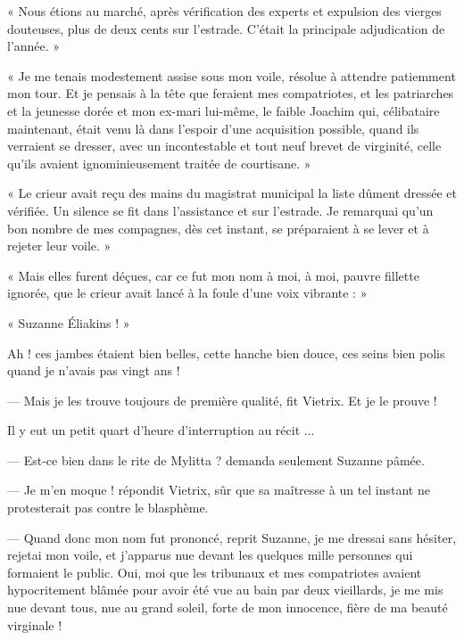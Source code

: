 \documentclass[a4paper, 11pt, oneside, polutonikogreek, french]{article}
\begin{document}
« Nous étions au marché, après vérification des experts et expulsion des vierges douteuses, plus de deux cents sur l'estrade. C'était la principale adjudication de l'année. »

« Je me tenais modestement assise sous mon voile, résolue à attendre patiemment mon tour. Et je pensais à la tête que feraient mes compatriotes, et les patriarches et la jeunesse dorée et mon ex-mari lui-même, le faible Joachim qui, célibataire maintenant, était venu là dans l'espoir d'une acquisition possible, quand ils verraient se dresser, avec un incontestable et tout neuf brevet de virginité, celle qu'ils avaient ignominieusement traitée de courtisane. »

« Le crieur avait reçu des mains du magistrat municipal la liste dûment dressée et vérifiée. Un silence se fit dans l'assistance et sur l'estrade. Je remarquai qu'un bon nombre de mes compagnes, dès cet instant, se préparaient à se lever et à rejeter leur voile. »

« Mais elles furent déçues, car ce fut mon nom à moi, à moi, pauvre fillette ignorée, que le crieur avait lancé à la foule d'une voix vibrante : »

« Suzanne Éliakins ! »

Ah ! ces jambes étaient bien belles, cette hanche bien douce, ces seins bien polis quand je n'avais pas vingt ans !

--- Mais je les trouve toujours de première qualité, fit Vietrix. Et je le prouve !

Il y eut un petit quart d'heure d'interruption au récit ...

\bigskip
\centerline{\EightStarTaper}
\centerline{\EightStarTaper\EightStarTaper}
\bigskip

--- Est-ce bien dans le rite de Mylitta ? demanda seulement Suzanne pâmée.

--- Je m'en moque ! répondit Vietrix, sûr que sa maîtresse à un tel instant ne protesterait pas contre le blasphème.

\bigskip
\centerline{\EightStarTaper}
\centerline{\EightStarTaper\EightStarTaper}
\bigskip

--- Quand donc mon nom fut prononcé, reprit Suzanne, je me dressai sans hésiter, rejetai mon voile, et j'apparus nue devant les quelques mille personnes qui formaient le public. Oui, moi que les tribunaux et mes compatriotes avaient hypocritement blâmée pour avoir été vue au bain par deux vieillards, je me mis nue devant tous, nue au grand soleil, forte de mon innocence, fière de ma beauté virginale !
\end{document}
